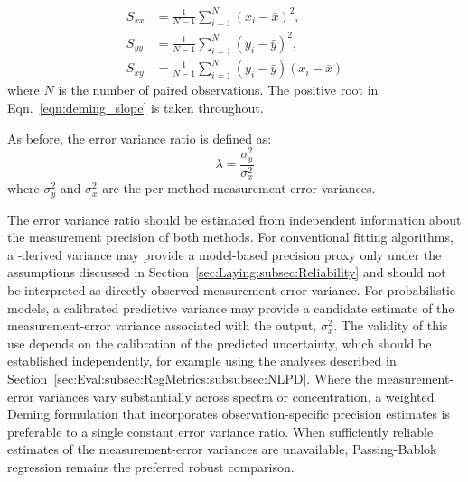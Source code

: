 \begin{equation}\label{eqn:deming_variances}
    \begin{aligned}
        S_{xx} &= \frac{1}{N-1}\sum_{i=1}^{N}\left(x_i - \bar{x}\right)^2,
        \qquad \\
        S_{yy} &= \frac{1}{N-1}\sum_{i=1}^{N}\left(y_i - \bar{y}\right)^2,
        \qquad \\
        S_{xy} &= \frac{1}{N-1}\sum_{i=1}^{N}\left(y_i - \bar{y}\right)\!\left(x_i - \bar{x}\right)
    \end{aligned}
\end{equation}
\noindent where $N$ is the number of paired observations. The positive root in Eqn.~\ref{eqn:deming_slope} is taken throughout. 

As before, the error variance ratio is defined as:
\begin{equation}\label{eqn:deming_lambda}
    \lambda = \frac{\sigma_y^2}{\sigma_x^2}
\end{equation}
\noindent where $\sigma_y^2$ and $\sigma_x^2$ are the per-method measurement error variances.

The error variance ratio should be estimated from independent information about the measurement precision of both methods. For conventional fitting algorithms, a \CRLB-derived variance may provide a model-based precision proxy only under the assumptions discussed in Section~\ref{sec:Laying:subsec:Reliability} and should not be interpreted as directly observed measurement-error variance. For probabilistic \DL models, a calibrated predictive variance may provide a candidate estimate of the measurement-error variance associated with the \DL output, \(\sigma_x^2\). The validity of this use depends on the calibration of the predicted uncertainty, which should be established independently, for example using the analyses described in Section~\ref{sec:Eval:subsec:RegMetrics:subsubsec:NLPD}. Where the measurement-error variances vary substantially across spectra or concentration, a weighted Deming formulation that incorporates observation-specific precision estimates is preferable to a single constant error variance ratio. When sufficiently reliable estimates of the measurement-error variances are unavailable, Passing-Bablok regression remains the preferred robust comparison.

